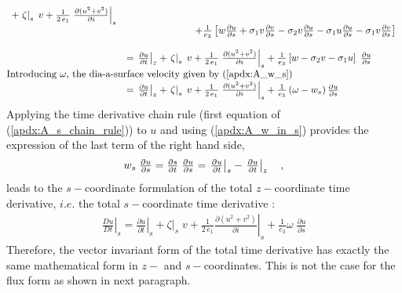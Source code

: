\documentclass[../main/NEMO_manual]{subfiles}
\begin{document}
\begin{subequations}
\begin{align*}
{\begin{array}{*{20}l}
        + \left. \zeta \right|_s \;v
        + \frac{1}{2\,e_1}\left. {\frac{\partial (u^2+v^2)}{\partial i}} \right|_s \\
      &\qquad \qquad \qquad \quad
        + \frac{1}{e_3} \left[    {w\frac{\partial u}{\partial s}
        +\sigma_1 v\frac{\partial v}{\partial s} - \sigma_2 v\frac{\partial u}{\partial s}
        - \sigma_1 u\frac{\partial u}{\partial s} - \sigma_1 v\frac{\partial v}{\partial s}} \right] \\ \\
      &= \left. {\frac{\partial u }{\partial t}} \right|_z
        + \left. \zeta \right|_s \;v
        + \frac{1}{2\,e_1}\left. {\frac{\partial (u^2+v^2)}{\partial i}} \right|_s
        + \frac{1}{e_3} \left[  w - \sigma_2 v - \sigma_1 u  \right]
        \; \frac{\partial u}{\partial s}   \\
      \intertext{Introducing $\omega$, the dia-a-surface velocity given by (\autoref{apdx:A_w_s}) }
      &= \left. {\frac{\partial u }{\partial t}} \right|_z
        + \left. \zeta \right|_s \;v
        + \frac{1}{2\,e_1}\left. {\frac{\partial (u^2+v^2)}{\partial i}} \right|_s
        + \frac{1}{e_3 } \left( \omega - w_s \right) \frac{\partial u}{\partial s}   \\
    \end{array}
    }
  \end{align*}
\end{subequations}
%
Applying the time derivative chain rule (first equation of (\autoref{apdx:A_s_chain_rule})) to $u$ and
using (\autoref{apdx:A_w_in_s}) provides the expression of the last term of the right hand side,
\[
  {
    \begin{array}{*{20}l}
      w_s  \;\frac{\partial u}{\partial s}
      = \frac{\partial s}{\partial t} \;  \frac{\partial u }{\partial s}
      = \left. {\frac{\partial u }{\partial t}} \right|_s  - \left. {\frac{\partial u }{\partial t}} \right|_z \quad ,
    \end{array}
  }
\]
leads to the $s-$coordinate formulation of the total $z-$coordinate time derivative,
$i.e.$ the total $s-$coordinate time derivative :
\begin{align}
  \label{apdx:A_sco_Dt_vect}
  \left. \frac{D u}{D t} \right|_s
  = \left. {\frac{\partial u }{\partial t}} \right|_s
  + \left. \zeta \right|_s \;v
  + \frac{1}{2\,e_1}\left. {\frac{\partial (u^2+v^2)}{\partial i}} \right|_s
  + \frac{1}{e_3 } \omega \;\frac{\partial u}{\partial s}
\end{align}
Therefore, the vector invariant form of the total time derivative has exactly the same mathematical form in
$z-$ and $s-$coordinates.
This is not the case for the flux form as shown in next paragraph.
\end{document}
